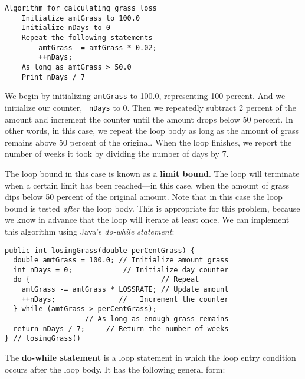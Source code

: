 \begin{jjjlisting}
\begin{lstlisting}
Algorithm for calculating grass loss
    Initialize amtGrass to 100.0
    Initialize nDays to 0
    Repeat the following statements
        amtGrass -= amtGrass * 0.02;
        ++nDays;
    As long as amtGrass > 50.0
    Print nDays / 7
\end{lstlisting}
\end{jjjlisting}

\noindent We begin by initializing {\tt amtGrass} to
100.0, representing 100 percent. And we initialize our counter, {\tt
nDays} to 0. Then we repeatedly subtract 2 percent of the amount and
increment the counter until the amount drops below 50 percent. In
other words, in this case, we repeat the loop body as long as the
amount of grass remains above 50 percent of the original. When the
loop finishes, we report the number of weeks it took by dividing the
number of days by 7.

The loop bound in this case is known as a {\bf limit bound}. The loop
will terminate when a certain limit has been reached---in this case,
when the amount of grass dips below 50 percent of the original amount.
Note that in this case the loop bound is tested {\it after} the loop
body. This is appropriate for this problem, because we know in advance
that the loop will iterate at least once. We can implement this
algorithm using Java's {\it do-while statement}:

\begin{jjjlisting}
\begin{lstlisting}
public int losingGrass(double perCentGrass) {
  double amtGrass = 100.0; // Initialize amount grass
  int nDays = 0;            // Initialize day counter
  do {                               // Repeat
    amtGrass -= amtGrass * LOSSRATE; // Update amount
    ++nDays;               //   Increment the counter
  } while (amtGrass > perCentGrass);   
                   // As long as enough grass remains
  return nDays / 7;     // Return the number of weeks
} // losingGrass()
\end{lstlisting}
\end{jjjlisting}

\noindent The {\bf do-while statement} is a loop statement in which the loop
entry condition occurs after the loop body. It has the following
general form:

